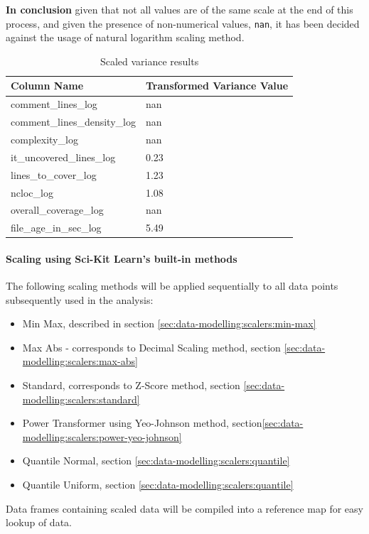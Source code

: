\textbf{In conclusion} given that not all values are of the same scale at the end of this process, and given the presence of non-numerical values, \texttt{nan}, it has been decided against the usage of natural logarithm scaling method.
\begin{table}[!h]
\centering
\caption{Scaled variance results}
\label{tbl:loge-scaler-cols-transformed}
\begin{tabular}{@{}ll@{}}
\toprule
Column Name & Transformed Variance Value \\ \midrule
comment\_lines\_log & nan \\
comment\_lines\_density\_log & nan \\
complexity\_log & nan \\
it\_uncovered\_lines\_log & 0.23 \\
lines\_to\_cover\_log & 1.23 \\
ncloc\_log & 1.08 \\
overall\_coverage\_log & nan \\
file\_age\_in\_sec\_log & 5.49 \\ \bottomrule
\end{tabular}
\end{table}


\paragraph{Scaling using Sci-Kit Learn's built-in methods}
The following scaling methods will be applied sequentially to all data points subsequently used in the analysis:
\begin{itemize}\label{lst:list-of-scalers}
    \item Min Max, described in section \ref{sec:data-modelling:scalers:min-max}
    \item Max Abs - corresponds to Decimal Scaling method, section \ref{sec:data-modelling:scalers:max-abs}
    \item Standard, corresponds to Z-Score method, section \ref{sec:data-modelling:scalers:standard}
    \item Power Transformer using Yeo-Johnson method, section\ref{sec:data-modelling:scalers:power-yeo-johnson}
    \item Quantile Normal, section \ref{sec:data-modelling:scalers:quantile}
    \item Quantile Uniform, section \ref{sec:data-modelling:scalers:quantile}
\end{itemize}

Data frames containing scaled data will be compiled into a reference map for easy lookup of data.

